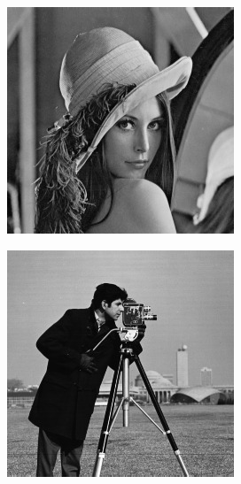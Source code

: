 \begin{figure}[!ht]
\begin{subfigure}[b]{0.17\textwidth}
                    \caption{}
                    \label{fig:waterloo-slop}
                \end{subfigure}
                \hfill
                \begin{subfigure}[b]{0.17\textwidth}
                    \centering
                    \includegraphics[width=\textwidth]{images/lena1.jpg}
                    \caption{}
                    \label{fig:waterloo-lena1}
                \end{subfigure}
                \hfill
                \begin{subfigure}[b]{0.17\textwidth}
                    \centering
                    \includegraphics[width=\textwidth]{images/camera.jpg}

\end{subfigure}
\end{figure}

